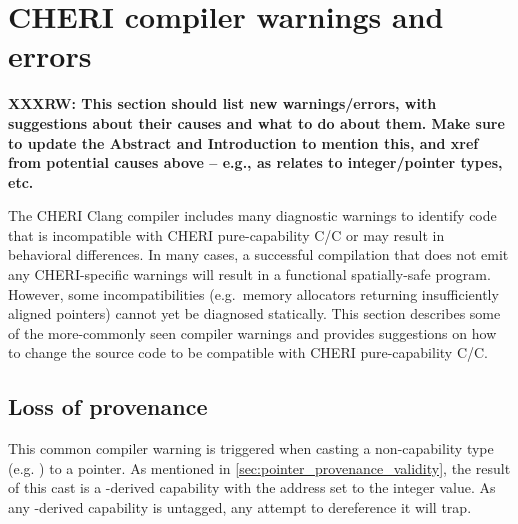 \documentclass[12pt,twoside,openright,a4paper]{article}
\newcommand{\ccode}[1]{{\small\ttfamily{#1}}}
\newcommand{\clongt}{{\ccode{long}}\xspace}
\newcommand{\note}[2]{{\color{blue}[ Note: #1 - #2]}}
\renewcommand{\note}[2]{\relax\ifhmode\unskip\fi}
\newcommand{\arnote}[1]{\note{#1}{Alex R.}}
\newcommand*{\cpp}[1][]{C\textsmaller[2]{\nolinebreak[4]\hspace{-.05em}\raisebox{.45ex}{\textbf{++}}}}
\newcommand*{\purecapCOrCpp}[1]{CHERI pure-capability C/\cpp{}}
\begin{document}
\section{CHERI compiler warnings and errors}

\textbf{XXXRW: This section should list new warnings/errors, with suggestions
  about their causes and what to do about them.  Make sure to update the
  Abstract and Introduction to mention this, and xref from potential causes
  above -- e.g., as relates to integer/pointer types, etc.}

\arnote{Feed the source code into \url{https://cheri-compiler-explorer.cl.cam.ac.uk/} to get the latest warning text}

The CHERI Clang compiler includes many diagnostic warnings to identify code that is incompatible with \purecapCOrCpp{} or may result in behavioral differences.
In many cases, a successful compilation that does not emit any CHERI-specific warnings will result in a functional spatially-safe program.
However, some incompatibilities (e.g.\ memory allocators returning insufficiently aligned pointers) cannot yet be diagnosed statically.
This section describes some of the more-commonly seen compiler warnings and provides suggestions on how to change the source code to be compatible with \purecapCOrCpp{}.

\subsection{Loss of provenance}
This common compiler warning \arnote{that should be an error by default?} is triggered when casting a non-capability type (e.g. \clongt) to a pointer.
As mentioned in \cref{sec:pointer_provenance_validity}, the result of this cast is a \ccode{NULL}-derived capability with the address set to the integer value.
As any \ccode{NULL}-derived capability is untagged, any attempt to dereference it will trap.
\end{document}
